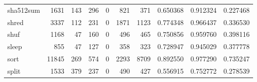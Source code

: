 \begin{longtable}{lrrrrrrrrr}
sha512sum &                                1631 &                                             143 &                                            296 &                                             0 &                                            821 &                                          371 &                                           0.650368 &                               0.912324 &                             0.227468 \\
shred     &                                3337 &                                             112 &                                            231 &                                             0 &                                           1871 &                                         1123 &                                           0.774348 &                               0.966437 &                             0.336530 \\
shuf      &                                1168 &                                              47 &                                            160 &                                             0 &                                            496 &                                          465 &                                           0.750856 &                               0.959760 &                             0.398116 \\
sleep     &                                 855 &                                              47 &                                            127 &                                             0 &                                            358 &                                          323 &                                           0.728947 &                               0.945029 &                             0.377778 \\
sort      &                               11845 &                                             269 &                                            574 &                                             0 &                                           2293 &                                         8709 &                                           0.892550 &                               0.977290 &                             0.735247 \\
split     &                                1533 &                                             379 &                                            237 &                                             0 &                                            490 &                                          427 &                                           0.556915 &                               0.752772 &                             0.278539 \\

\end{longtable}
